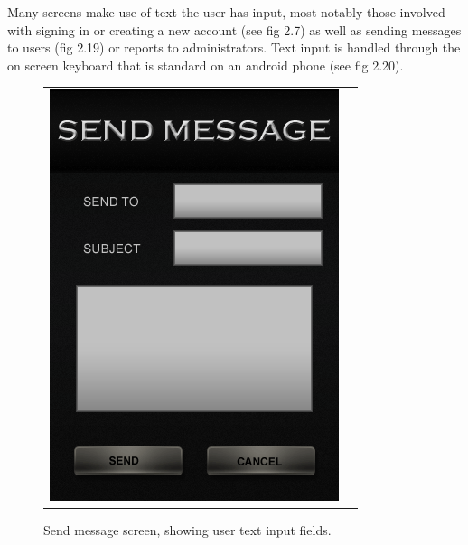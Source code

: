 Many screens make use of text the user has input, most notably those involved with signing in or creating a new account (see fig 2.7) as well as sending messages to users (fig 2.19) or reports to administrators. Text input is handled through the on screen keyboard that is standard on an android phone (see fig 2.20). 
\vspace{0pt}
\begin{figure}[h!]
\centering
\begin{tabular}{cc}
	\begin{minipage}{0.3\textwidth}
		\begin{center}
		\begin{minipage}{0.83\textwidth}
		\includegraphics[width=\textwidth]{images/send_message_mockup}
		\caption{Send message screen, showing user text input fields.}
		\label{send_message}
		\end{minipage}

\end{center}
\end{minipage}
\end{tabular}
\end{figure}
